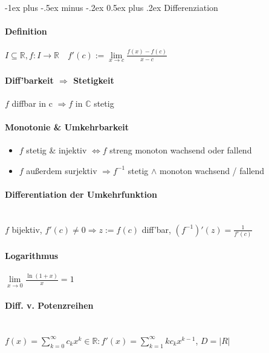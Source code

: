 \documentclass[paper=a3,paper=landscape, fontsize=9pt, DIV=30]{scrartcl}
\makeatletter
\newcommand{\real}{{\mathbb{R}}}
\newcommand{\compl}{\mathbb{C}}
\renewcommand{\section}{\@startsection{section}{1}{0mm}%
  {-1ex plus -.5ex minus -.2ex}%
  {0.5ex plus .2ex}%
  {\color{blue}\normalfont\large\bfseries}}
\makeatother
\begin{document}
\begin{multicols*}{4}
  \section{Differenziation}

  \paragraph{Definition}
  $I \subseteq \real, f: I \rightarrow \real
\quad f'(c) := \lim\limits_{x \rightarrow c} \frac{f(x)-f(c)}{x-c}$

  \paragraph{Diff'barkeit $\Rightarrow$ Stetigkeit}
  $f$ diffbar in c $\Rightarrow f$ in $\compl$ stetig

  \paragraph{Monotonie \& Umkehrbarkeit}
  \begin{itemize}
  \item $f$ stetig \& injektiv $\Leftrightarrow f$ streng monoton wachsend oder fallend
  \item $f$ außerdem surjektiv $\Rightarrow f^{-1}$ stetig $\wedge$ monoton wachsend / fallend
  \end{itemize}


  \paragraph{Differentiation der Umkehrfunktion}\hspace{0pt}\\
  $f$ bijektiv, $f'(c) \neq 0 \Rightarrow z := f(c)$ diff'bar, $(f^{-1})'(z)=\frac{1}{f'(c)}$
	
  \paragraph{Logarithmus}
  $\lim\limits_{x\rightarrow0} \frac{\ln(1+x)}{x}=1$

  \paragraph{Diff. v. Potenzreihen}\hspace{0pt}\\
  $ f(x)=\sum_{k=0}^{\infty}c_kx^k \in \real: f'(x)=\sum_{k=1}^{\infty}kc_kx^{k-1}$, $D = \lvert R \rvert$


\end{multicols*}
\end{document}
